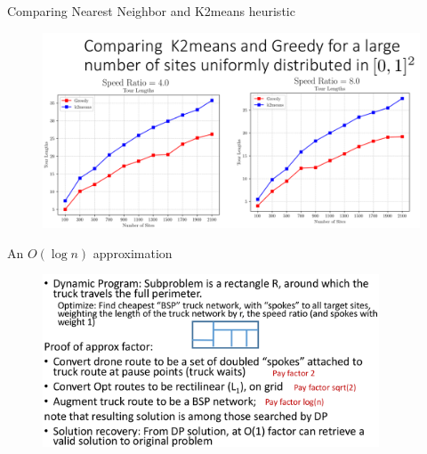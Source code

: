 \documentclass{beamer}
\begin{document}
\begin{frame}[t]{Comparing Nearest Neighbor and K2means heuristic}
  \vspace{-20pt}
  \begin{figure}
    \centering
     \includegraphics[width=12cm]{slide_imgs/compare_k2means_greedy.png}
   \end{figure}
\end{frame}



\begin{frame}{An $O(\log n)$ approximation}

  \begin{figure}
        \includegraphics[width=10.0cm]{slide_imgs/logn_approx.png}
  \end{figure}

\end{frame}
\end{document}
